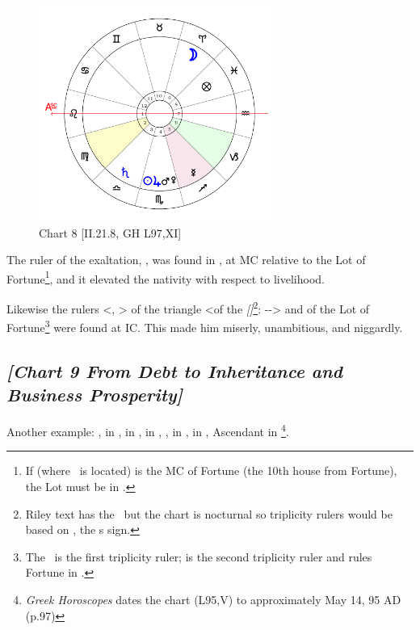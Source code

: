 \clearpage
\begin{figure}
\centering
\vspace{-20pt}
\includegraphics[width=0.68\textwidth]{charts/2_21_8}
\caption{Chart 8 [II.21.8, GH L97,XI]}
\label{fig:chart08}
\end{figure}

The ruler of the exaltation, \Mercury, was found in \Sagittarius, at MC relative to the Lot of Fortune\footnote{If \Sagittarius\xspace (where \Mercury\, is located) is the MC of Fortune (the 10th house from Fortune), the Lot must be in \Pisces.}, and it elevated the nativity with respect to livelihood. 

Likewise the rulers <\Sun, \Jupiter> of the triangle <of the \textsl{[\Moon]}\footnote{Riley text has the \Sun\, but the chart is nocturnal so triplicity rulers would be based on \Aries, the \Moon
s sign.}: \Aries-\Leo-\Sagittarius> and of the Lot of Fortune\footnote{The \Sun\, is the first triplicity ruler; \Jupiter\xspace is the second triplicity ruler and rules Fortune in \Pisces.} were found at IC. This made him miserly, unambitious, and niggardly.

\newpage
\subsection*{\textit{[Chart 9 From Debt to Inheritance and Business Prosperity]}}
\addcontentsline{toc}{subsection}{\textit{[Chart 9 [GH L95] From Debt to Inheritance and Business Prosperity}}

Another example: \Sun, \Mercury\xspace in \Taurus, \Moon\xspace in \Aquarius, \Saturn\xspace in \Leo, \Mars, \Venus\xspace in \Cancer, \Jupiter\xspace in \Virgo, Ascendant in \Sagittarius
\footnote{\textit{Greek Horoscopes} dates the chart (L95,V) to approximately May 14, 95 AD (p.97)}.

